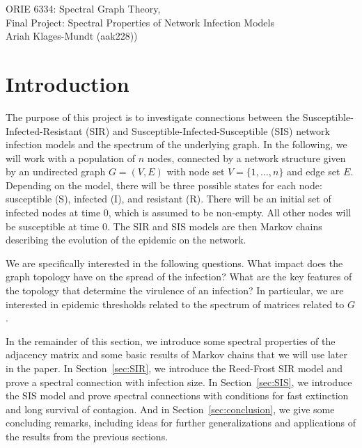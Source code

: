 \documentclass[11pt]{article}
\newcommand{\yourtitle}{ORIE 6334: Spectral Graph Theory}
\newcommand{\yoursubtitle}{Final Project: Spectral Properties of Network Infection Models}
\begin{document}
\newcommand{\Half}{\frac{1}{2}}



\begin{center}\LARGE\yourtitle,\\ \yoursubtitle\\
\large Ariah Klages-Mundt (aak228))
\end{center}

\section{Introduction}

The purpose of this project is to investigate connections between the Susceptible-Infected-Resistant (SIR) and Susceptible-Infected-Susceptible (SIS) network infection models and the spectrum of the underlying graph. In the following, we will work with a population of $n$ nodes, connected by a network structure given by an undirected graph $G=(V,E)$ with node set $V=\{1,\ldots,n\}$ and edge set $E$. Depending on the model, there will be three possible states for each node: susceptible (S), infected (I), and resistant (R). There will be an initial set of infected nodes at time 0, which is assumed to be non-empty. All other nodes will be susceptible at time 0. The SIR and SIS models are then Markov chains describing the evolution of the epidemic on the network.

We are specifically interested in the following questions. What impact does the graph topology have on the spread of the infection? What are the key features of the topology that determine the virulence of an infection? In particular, we are interested in epidemic thresholds related to the spectrum of matrices related to $G$.

In the remainder of this section, we introduce some spectral properties of the adjacency matrix and some basic results of Markov chains that we will use later in the paper. In Section~\ref{sec:SIR}, we introduce the Reed-Frost SIR model and prove a spectral connection with infection size. In Section~\ref{sec:SIS}, we introduce the SIS model and prove spectral connections with conditions for fast extinction and long survival of contagion. And in Section~\ref{sec:conclusion}, we give some concluding remarks, including ideas for further generalizations and applications of the results from the previous sections.


\end{document}
